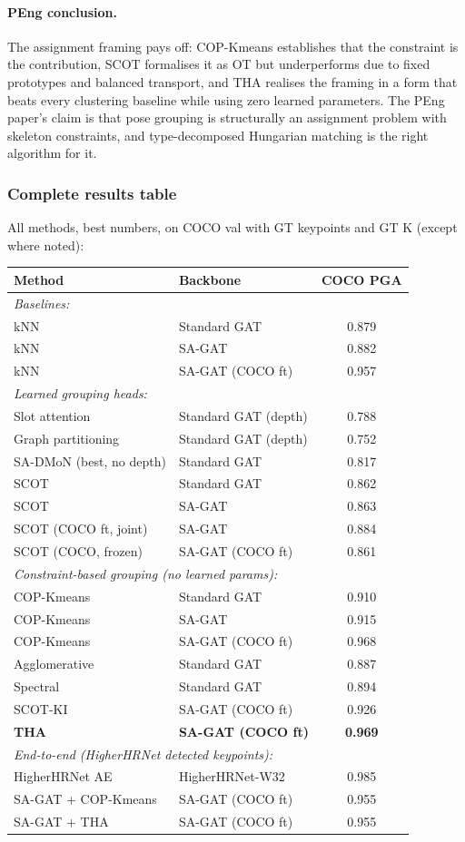 \paragraph{PEng conclusion.} The assignment framing pays off: COP-Kmeans establishes that the constraint is the contribution, SCOT formalises it as OT but underperforms due to fixed prototypes and balanced transport, and THA realises the framing in a form that beats every clustering baseline while using zero learned parameters. The PEng paper's claim is that pose grouping is structurally an assignment problem with skeleton constraints, and type-decomposed Hungarian matching is the right algorithm for it.


\subsubsection{Complete results table}

All methods, best numbers, on COCO val with GT keypoints and GT K (except where noted):

\begin{tabular}{llc}
\hline
\textbf{Method} & \textbf{Backbone} & \textbf{COCO PGA} \\
\hline
\multicolumn{3}{l}{\emph{Baselines:}} \\
kNN & Standard GAT & 0.879 \\
kNN & SA-GAT & 0.882 \\
kNN & SA-GAT (COCO ft) & 0.957 \\
\hline
\multicolumn{3}{l}{\emph{Learned grouping heads:}} \\
Slot attention & Standard GAT (depth) & 0.788 \\
Graph partitioning & Standard GAT (depth) & 0.752 \\
SA-DMoN (best, no depth) & Standard GAT & 0.817 \\
SCOT & Standard GAT & 0.862 \\
SCOT & SA-GAT & 0.863 \\
SCOT (COCO ft, joint) & SA-GAT & 0.884 \\
SCOT (COCO, frozen) & SA-GAT (COCO ft) & 0.861 \\
\hline
\multicolumn{3}{l}{\emph{Constraint-based grouping (no learned params):}} \\
COP-Kmeans & Standard GAT & 0.910 \\
COP-Kmeans & SA-GAT & 0.915 \\
COP-Kmeans & SA-GAT (COCO ft) & 0.968 \\
Agglomerative & Standard GAT & 0.887 \\
Spectral & Standard GAT & 0.894 \\
SCOT-KI & SA-GAT (COCO ft) & 0.926 \\
\textbf{THA} & \textbf{SA-GAT (COCO ft)} & \textbf{0.969} \\
\hline
\multicolumn{3}{l}{\emph{End-to-end (HigherHRNet detected keypoints):}} \\
HigherHRNet AE & HigherHRNet-W32 & 0.985 \\
SA-GAT + COP-Kmeans & SA-GAT (COCO ft) & 0.955 \\
SA-GAT + THA & SA-GAT (COCO ft) & 0.955 \\
\hline
\end{tabular}

